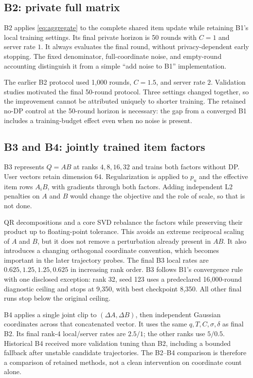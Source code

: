 \subsection{B2: private full matrix}
B2 applies \cref{eq:aggregate} to the complete shared item update while retaining
B1's local training settings. Its final private horizon is 50 rounds with
$C=1$ and server rate $1$. It always evaluates the final round, without
privacy-dependent early stopping. The fixed denominator, full-coordinate
noise, and empty-round accounting distinguish it from a simple ``add noise
to B1'' implementation.

The earlier B2 protocol used 1,000 rounds, $C=1.5$, and server rate $2$.
Validation studies motivated the final 50-round protocol. Three settings
changed together, so the improvement cannot be attributed uniquely to
shorter training. The retained no-DP control at the 50-round horizon is
necessary: the gap from a converged B1 includes a training-budget effect
even when no noise is present.

\subsection{B3 and B4: jointly trained item factors}
B3 represents $Q=AB$ at ranks $4,8,16,32$ and trains both factors without DP.
User vectors retain dimension $64$. Regularization is applied to $p_u$ and
the effective item rows $A_iB$, with gradients through both factors. Adding
independent L2 penalties on $A$ and $B$ would change the objective and the
role of scale, so that is not done.

QR decompositions and a core SVD rebalance the factors while preserving their
product up to floating-point tolerance. This avoids an extreme reciprocal
scaling of $A$ and $B$, but it does not remove a perturbation already present
in $AB$. It also introduces a changing orthogonal coordinate convention,
which becomes important in the later trajectory probes. The final B3 local
rates are $0.625,1.25,1.25,0.625$ in increasing rank order. B3 follows B1's
convergence rule with one disclosed exception: rank 32, seed 123 uses a
predeclared 16,000-round diagnostic ceiling and stops at 9,350, with best
checkpoint 8,350. All other final runs stop below the original ceiling.

B4 applies a single joint clip to $(\Delta A,\Delta B)$, then independent
Gaussian coordinates across that concatenated vector. It uses the same
$q,T,C,\sigma,\delta$ as final B2. Its final rank-4 local/server rates are
$2.5/1$; the other ranks use $5/0.5$. Historical B4 received more validation
tuning than B2, including a bounded fallback after unstable candidate
trajectories. The B2--B4 comparison is therefore a comparison of retained
methods, not a clean intervention on coordinate count alone.

